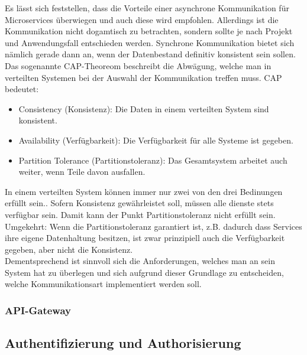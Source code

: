Es lässt sich feststellen, dass die Vorteile einer asynchrone Kommunikation für Microservices überwiegen und auch diese wird empfohlen.\cite{wolff2018mic_praxis}\cite{bruce2019mic_in_action} Allerdings ist die Kommunikation nicht dogamtisch zu betrachten, sondern sollte je nach Projekt und Anwendungsfall entschieden werden. Synchrone Kommunikation bietet sich nämlich gerade dann an, wenn der Datenbestand definitiv konsistent sein sollen. \\

Das sogenannte CAP-Theoreom beschreibt die Abwägung, welche man in verteilten Systemen bei der Auswahl der Kommunikation treffen muss. CAP bedeutet:
	\begin{itemize}
		\item Consistency (Konsistenz): Die Daten in einem verteilten System sind konsistent.
		\item Availability (Verfügbarkeit): Die Verfügbarkeit für alle Systeme ist gegeben. 
		\item Partition Tolerance (Partitionstoleranz): Das Gesamtsystem arbeitet auch weiter, wenn Teile davon ausfallen. 
	\end{itemize}  

In einem verteilten System können immer nur zwei von den drei Bedinungen erfüllt sein.\cite{wolff2018mic_praxis}. Sofern Konsistenz gewährleistet soll, müssen alle dienste stets verfügbar sein. Damit kann der Punkt Partitionstoleranz nicht erfüllt sein. Umgekehrt: Wenn die Partitionstoleranz garantiert ist, z.B. dadurch dass Services ihre eigene Datenhaltung besitzen, ist zwar prinzipiell auch die Verfügbarkeit gegeben, aber nicht die Konsistenz. \\

Dementsprechend ist sinnvoll sich die Anforderungen, welches man an sein System hat zu überlegen und sich aufgrund dieser Grundlage zu entscheiden, welche Kommunikationsart implementiert werden soll. 

\subsubsection{API-Gateway}



\subsection{Authentifizierung und Authorisierung}



